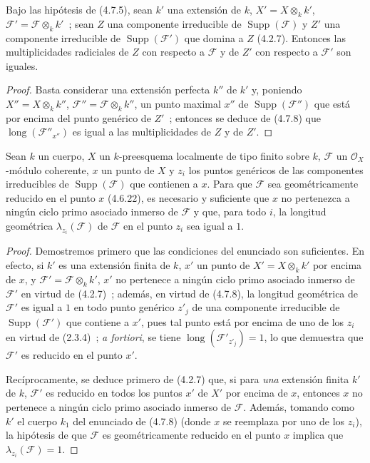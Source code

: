 \begin{corollary}[4.7.9]
\label{IV.2.4.7.9-fr}
Bajo las hipótesis de \textup{(4.7.5)}, sean $k'$ una extensión de $k$,
$X'=X\otimes_k k'$, $\mathscr F'=\mathscr F\otimes_k k'$~; sean $Z$ una
componente irreducible de $\operatorname{Supp}(\mathscr F)$ y $Z'$ una
componente irreducible de $\operatorname{Supp}(\mathscr F')$ que domina a $Z$
\textup{(4.2.7)}. Entonces las multiplicidades radiciales de $Z$ con respecto a
$\mathscr F$ y de $Z'$ con respecto a $\mathscr F'$ son iguales.
\end{corollary}


\begin{proof}
Basta considerar una extensión perfecta $k''$ de $k'$ y, poniendo
$X''=X\otimes_k k''$, $\mathscr F''=\mathscr F\otimes_k k''$, un punto maximal
$x''$ de $\operatorname{Supp}(\mathscr F'')$ que está por encima del punto
genérico de $Z'$~; entonces se deduce de (4.7.8) que
$\operatorname{long}(\mathscr F''_{x''})$ es igual a las multiplicidades de $Z$
y de $Z'$.
\end{proof}

\begin{proposition}[4.7.10]
\label{IV.2.4.7.10-fr}
Sean $k$ un cuerpo, $X$ un $k$-preesquema localmente de tipo finito sobre $k$,
$\mathscr F$ un $\mathcal O_X$-módulo coherente, $x$ un punto de $X$ y $z_i$ los
puntos genéricos de las componentes irreducibles de
$\operatorname{Supp}(\mathscr F)$ que contienen a $x$. Para que $\mathscr F$ sea
geométricamente reducido en el punto $x$ \textup{(4.6.22)}, es necesario y suficiente
que $x$ no pertenezca a ningún ciclo primo asociado inmerso de $\mathscr F$ y
que, para todo $i$, la longitud geométrica $\lambda_{z_i}(\mathscr F)$ de
$\mathscr F$ en el punto $z_i$ sea igual a $1$.
\end{proposition}

\begin{proof}
Demostremos primero que las condiciones del enunciado son suficientes. En
efecto, si $k'$ es una extensión finita de $k$, $x'$ un punto de
$X'=X\otimes_k k'$ por encima de $x$, y
$\mathscr F'=\mathscr F\otimes_k k'$, $x'$ no pertenece a ningún ciclo primo
asociado inmerso de $\mathscr F'$ en virtud de (4.2.7)~; además, en virtud de
(4.7.8), la longitud geométrica de $\mathscr F'$ es igual a $1$ en todo punto
genérico $z'_j$ de una componente irreducible de
$\operatorname{Supp}(\mathscr F')$ que contiene a $x'$, pues tal punto está por
encima de uno de los $z_i$ en virtud de (2.3.4)~; \emph{a fortiori}, se tiene
$\operatorname{long}(\mathscr F'_{z'_j})=1$, lo que demuestra que $\mathscr F'$
es reducido en el punto $x'$.

Recíprocamente, se deduce primero de (4.2.7) que, si para \emph{una} extensión finita
$k'$ de $k$, $\mathscr F'$ es reducido en todos los puntos $x'$ de $X'$ por
encima de $x$, entonces $x$ no pertenece a ningún ciclo primo asociado inmerso
de $\mathscr F$. Además, tomando como $k'$ el cuerpo $k_1$ del enunciado de
(4.7.8) (donde $x$ se reemplaza por uno de los $z_i$), la hipótesis de que
$\mathscr F$ es geométricamente reducido en el punto $x$ implica que
$\lambda_{z_i}(\mathscr F)=1$.
\end{proof}
